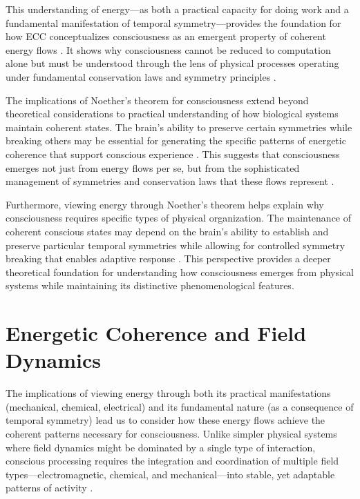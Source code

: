 \begin{refsection}
This understanding of energy—as both a practical capacity for doing work and a fundamental manifestation of temporal symmetry—provides the foundation for how ECC conceptualizes consciousness as an emergent property of coherent energy flows \cite{Feynman1963}. It shows why consciousness cannot be reduced to computation alone but must be understood through the lens of physical processes operating under fundamental conservation laws and symmetry principles \cite{Laughlin2005}.

The implications of Noether's theorem for consciousness extend beyond theoretical considerations to practical understanding of how biological systems maintain coherent states. The brain's ability to preserve certain symmetries while breaking others may be essential for generating the specific patterns of energetic coherence that support conscious experience \cite{Nicolis1977}. This suggests that consciousness emerges not just from energy flows per se, but from the sophisticated management of symmetries and conservation laws that these flows represent \cite{Coopersmith2017}.

Furthermore, viewing energy through Noether's theorem helps explain why consciousness requires specific types of physical organization. The maintenance of coherent conscious states may depend on the brain's ability to establish and preserve particular temporal symmetries while allowing for controlled symmetry breaking that enables adaptive response \cite{Prigogine1978}. This perspective provides a deeper theoretical foundation for understanding how consciousness emerges from physical systems while maintaining its distinctive phenomenological features.

\section{Energetic Coherence and Field Dynamics}

The implications of viewing energy through both its practical manifestations (mechanical, chemical, electrical) and its fundamental nature (as a consequence of temporal symmetry) lead us to consider how these energy flows achieve the coherent patterns necessary for consciousness. Unlike simpler physical systems where field dynamics might be dominated by a single type of interaction, conscious processing requires the integration and coordination of multiple field types—electromagnetic, chemical, and mechanical—into stable, yet adaptable patterns of activity \cite{Freeman2006}.


\end{refsection}
